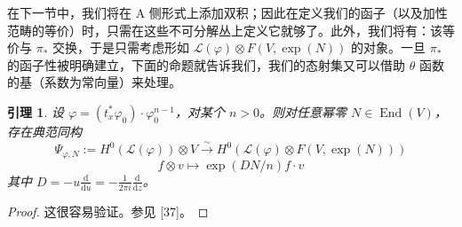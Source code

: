 \documentclass[11pt,a4paper]{article}
\theoremstyle{plain}
\newtheorem{lemma}[theorem]{引理}
\theoremstyle{definition}
\begin{document}

在下一节中，我们将在 A 侧形式上添加双积；因此在定义我们的函子（以及加性范畴的等价）时，只需在这些不可分解丛上定义它就够了。此外，我们将有：该等价与 $\pi_*$ 交换，于是只需考虑形如 $\mathcal{L}(\varphi)\otimes F(V,\exp(N))$ 的对象。一旦 $\pi_*$ 的函子性被明确建立，下面的命题就告诉我们，我们的态射集又可以借助 $\theta$ 函数的基（系数为常向量）来处理。

\begin{lemma}
设 $\varphi=(t^*_x\varphi_0)\cdot\varphi_0^{n-1}$，对某个 $n>0$。则对任意幂零 $N\in\operatorname{End}(V)$，存在典范同构
\begin{equation}\tag{7.1}
  \Psi_{\varphi,N}:=H^0(\mathcal{L}(\varphi))\otimes V
  \xrightarrow{\ \sim\ }
  H^0(\mathcal{L}(\varphi)\otimes F(V,\exp(N)))
\end{equation}
\begin{equation}\tag{7.2}
  f\otimes v\mapsto\exp(DN/n)f\cdot v
\end{equation}
其中 $D=-u\frac{\mathrm{d}}{\mathrm{d}u}=-\frac{1}{2\pi i}\frac{\mathrm{d}}{\mathrm{d}z}$。
\end{lemma}

\begin{proof}
这很容易验证。参见 [37]。
\end{proof}

\end{document}
